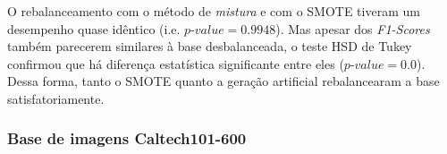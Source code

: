 
O rebalanceamento com o método de \emph{mistura} e com o SMOTE tiveram um desempenho quase idêntico (i.e. $\textit{p-value} = 0.9948$). Mas apesar dos \textit{F1-Scores} também parecerem similares à base desbalanceada, o teste HSD de Tukey confirmou que há diferença estatística significante entre eles ($\textit{p-value} = 0.0$). Dessa forma, tanto o SMOTE quanto a geração artificial rebalancearam a base satisfatoriamente.

\subsubsection{Base de imagens Caltech101-600}


